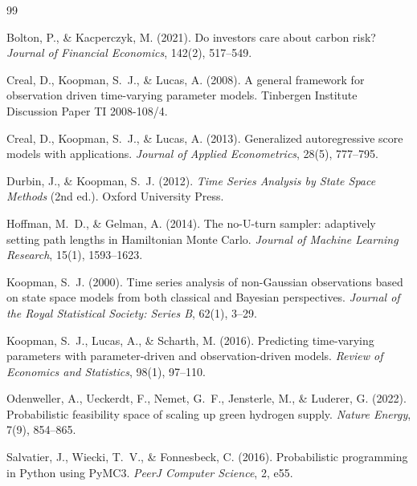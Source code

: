 \documentclass[11pt,a4paper]{article}
\begin{document}

\begin{thebibliography}{99}

Bolton, P., \& Kacperczyk, M. (2021).
\newblock Do investors care about carbon risk?
\newblock \textit{Journal of Financial Economics}, 142(2), 517--549.

Creal, D., Koopman, S.~J., \& Lucas, A. (2008).
\newblock A general framework for observation driven time-varying parameter models.
\newblock Tinbergen Institute Discussion Paper TI 2008-108/4.

Creal, D., Koopman, S.~J., \& Lucas, A. (2013).
\newblock Generalized autoregressive score models with applications.
\newblock \textit{Journal of Applied Econometrics}, 28(5), 777--795.

Durbin, J., \& Koopman, S.~J. (2012).
\newblock \textit{Time Series Analysis by State Space Methods} (2nd ed.).
\newblock Oxford University Press.

Hoffman, M.~D., \& Gelman, A. (2014).
\newblock The no-U-turn sampler: adaptively setting path lengths in Hamiltonian Monte Carlo.
\newblock \textit{Journal of Machine Learning Research}, 15(1), 1593--1623.

Koopman, S.~J. (2000).
\newblock Time series analysis of non-Gaussian observations based on state space models from both classical and Bayesian perspectives.
\newblock \textit{Journal of the Royal Statistical Society: Series B}, 62(1), 3--29.

Koopman, S.~J., Lucas, A., \& Scharth, M. (2016).
\newblock Predicting time-varying parameters with parameter-driven and observation-driven models.
\newblock \textit{Review of Economics and Statistics}, 98(1), 97--110.

Odenweller, A., Ueckerdt, F., Nemet, G.~F., Jensterle, M., \& Luderer, G. (2022).
\newblock Probabilistic feasibility space of scaling up green hydrogen supply.
\newblock \textit{Nature Energy}, 7(9), 854--865.

Salvatier, J., Wiecki, T.~V., \& Fonnesbeck, C. (2016).
\newblock Probabilistic programming in Python using PyMC3.
\newblock \textit{PeerJ Computer Science}, 2, e55.


\end{thebibliography}
\end{document}
